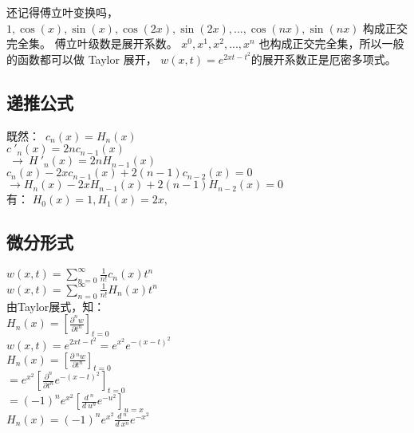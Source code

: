 \begin{remark}
还记得傅立叶变换吗，$	1, \cos(x), \sin (x), \cos(2x), \sin (2x), ..., \cos(nx), \sin (nx) $  构成正交完全集。 傅立叶级数是展开系数。
  $	x^0, x^1, x^2, ..., x^n $  也构成正交完全集，所以一般的函数都可以做 Taylor 展开，  $w(x,t)=e^{2xt-t^2}$的展开系数正是厄密多项式。
\end{remark}

\subsection{递推公式}
{  既然： $c_n(x)=H_n(x) $}  \\ 
{  $c~'_n(x)=2nc_{n-1}(x)    $ }   \\ 
{  $ ~\to~    H~'_n(x)=2nH_{n-1}(x)    $}   \\ 
{  $ c_{n}(x) -2xc_{n-1}(x) +2(n-1)c_{n-2} (x) =0  $ }   \\ 
{  $\to   H_{n}(x) -2xH_{n-1}(x) +2(n-1)H_{n-2} (x) =0  $ } \\
有： $H_0(x)=1,  H_1(x)=2x, $

\subsection{微分形式}
{ $ \displaystyle w(x,t) =\sum_{n=0}^{\infty} \frac{1}{n!}  c_n(x) t^n $ }\\
{ $ \displaystyle w(x,t) =\sum_{n=0}^{\infty} \frac{1}{n!}  H_n(x) t^n  $} \\
由Taylor展式，知：\\
{ $ \displaystyle  H_n(x) = \left[  \frac{\partial ^n w  }{\partial t^n}  \right] _{t=0} $} \\ 
{ $ \displaystyle w(x,t) = e^{2xt-t^2} = e^{x^2}  e^{-(x-t)^2} $} \\ 
{ $ \displaystyle  H_n(x) = \left[  \frac{\partial ~^n w  }{\partial t^n}  \right] _{t=0} $}\\ 
{$ 	\displaystyle  =e^{x^2}   \left[  \frac{\partial ^n }{\partial t^n}  e^{-(x-t)^2}   \right] _{t=0}   $}  \\ 
{$ 	\displaystyle  =(-1) ^n e^{x^2}   \left[  \frac{d~^n }{d~u^n}  e^{-u^2}   \right] _{u=x}   $}  \\ 
{$ 	\displaystyle H_n(x) =(-1) ^n e^{x^2}  \frac{d~^n }{d~x^n}  e^{-x^2}   $}  \\ 

